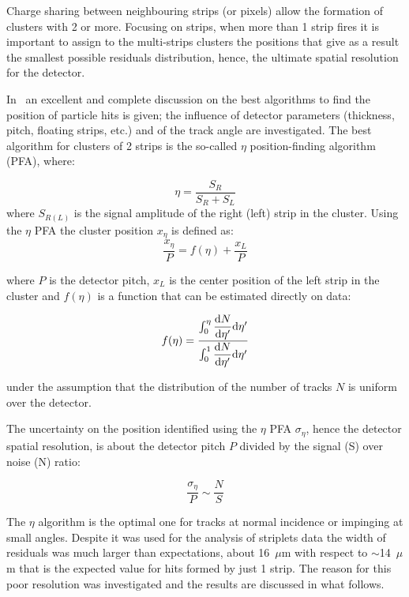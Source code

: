 Charge sharing between neighbouring strips (or pixels) allow the formation of clusters with 2 
or more. Focusing on strips, when more than 1 strip fires it is important to assign to the 
multi-strips clusters the positions that give as a result the smallest possible residuals distribution, 
hence, the ultimate spatial resolution for the detector. 


In~\cite{TURCHETTA} an excellent and complete discussion on the best algorithms to find 
the position of particle hits is given; the influence of detector parameters (thickness, pitch, 
floating strips, etc.) and of the track angle are investigated.
The best algorithm for clusters of 2 strips is the so-called $\eta$ position-finding algorithm (PFA), 
where:

\begin{equation}
\eta=\dfrac{S_R}{S_R+S_L}
\label{eq:eta}
\end{equation} 
where $S_{R(L)}$ is the signal amplitude of the right (left) strip in the cluster.
Using the $\eta$  PFA the cluster position $x_{\eta}$ is defined as:
 \begin{equation}
\dfrac{x_{\eta}}{P}=f(\eta)+\dfrac{x_L}{P}
\label{eq:xeta}
\end{equation} 

where $P$ is the detector pitch, $x_L$ is the center position of the left strip in the cluster and 
$f(\eta)$ is a function that can be estimated directly on data:

\begin{equation}
f(\eta)=\dfrac{\int_0^\eta \dfrac{{\rm d}N}{{\rm d}\eta'}{\rm d}\eta'}{\int_0^1 \dfrac{{\rm d}N}{{\rm d}\eta'}{\rm d}\eta'}
\end{equation}

under the assumption that the distribution of the number of tracks $N$ is uniform over the  
detector.

The uncertainty  on the position identified using the  $\eta$ PFA $\sigma_{\eta}$, hence the detector spatial 
resolution, is about the detector pitch $P$ 
divided by the signal (S) over noise (N) ratio:

\begin{equation}
\dfrac{\sigma_{\eta}}{P}\sim\dfrac{N}{S}
\label{eq:etanoise}
\end{equation}

The $\eta$ algorithm is the optimal one for tracks at normal incidence or impinging at small angles. 
Despite it was used for the analysis of striplets data the width of residuals was much 
larger than expectations, about 16~$\mu$m with respect to $\sim$14~$\mu$m that is the 
expected value  for hits formed by just 1 strip. The reason for this poor resolution 
was investigated and the results are discussed in what follows.

